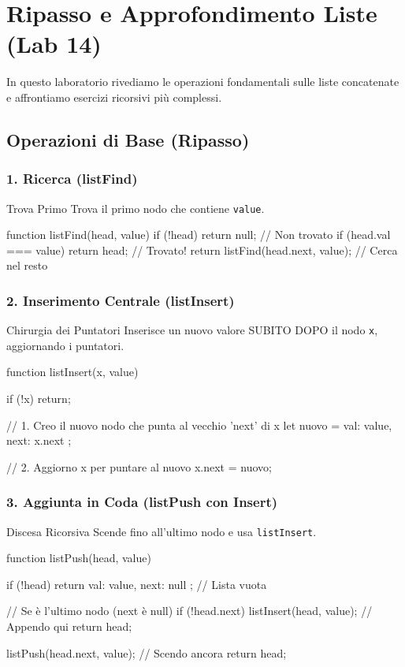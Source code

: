 \section{Ripasso e Approfondimento Liste (Lab 14)}

In questo laboratorio rivediamo le operazioni fondamentali sulle liste concatenate e affrontiamo esercizi ricorsivi più complessi.

\subsection{Operazioni di Base (Ripasso)}

\subsubsection{1. Ricerca (listFind)}
\begin{concept}{Trova Primo}
Trova il primo nodo che contiene \texttt{value}.
\end{concept}
\begin{jsbox}
function listFind(head, value) {
    if (!head) return null; // Non trovato
    if (head.val === value) return head; // Trovato!
    return listFind(head.next, value); // Cerca nel resto
}
\end{jsbox}

\subsubsection{2. Inserimento Centrale (listInsert)}
\begin{concept}{Chirurgia dei Puntatori}
Inserisce un nuovo valore SUBITO DOPO il nodo \texttt{x}, aggiornando i puntatori.
\end{concept}
\begin{jsbox}
function listInsert(x, value) {
    if (!x) return;
    
    // 1. Creo il nuovo nodo che punta al vecchio 'next' di x
    let nuovo = { val: value, next: x.next };
    
    // 2. Aggiorno x per puntare al nuovo
    x.next = nuovo;
}
\end{jsbox}

\subsubsection{3. Aggiunta in Coda (listPush con Insert)}
\begin{concept}{Discesa Ricorsiva}
Scende fino all'ultimo nodo e usa \texttt{listInsert}.
\end{concept}
\begin{jsbox}
function listPush(head, value) {
    if (!head) return { val: value, next: null }; // Lista vuota
    
    // Se è l'ultimo nodo (next è null)
    if (!head.next) {
        listInsert(head, value); // Appendo qui
        return head;
    }
    
    listPush(head.next, value); // Scendo ancora
    return head;
}
\end{jsbox}

